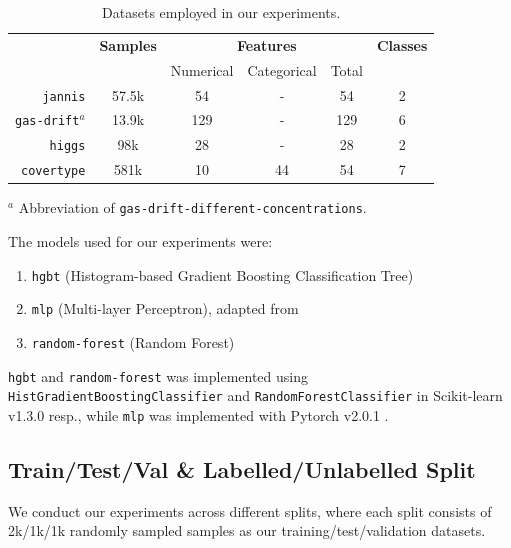 \documentclass{article}
\begin{document}
\begin{table}[htbp]
  \centering
  \caption{Datasets employed in our experiments.}
  \label{tab:datasets}
  \begin{tabular}{rccccc}
    \toprule
    & \textbf{Samples} & \multicolumn{3}{c}{\textbf{Features}} & \textbf{Classes} \\
    \cmidrule(lr){3-5}
    & & Numerical & Categorical & Total \\
    \midrule
    \small\texttt{jannis} \cite{grinsztajn2022why} & 57.5k & 54 & - & 54 & 2 \\
    \small\texttt{gas-drift}$^a$ \cite{grinsztajn2022why,shwartz-ziv2021tabular}
    & 13.9k & 129 & - & 129 & 6 \\
    \small\texttt{higgs} \cite{grinsztajn2022why,shwartz-ziv2021tabular}
    & 98k & 28 & - & 28 & 2 \\
    \small\texttt{covertype} \cite{shwartz-ziv2021tabular}
    & 581k & 10 & 44 & 54 & 7 \\
    \bottomrule
  \end{tabular}

  \footnotesize{
    $^a$ Abbreviation of \texttt{gas-drift-different-concentrations}.
  }
\end{table}

The models used for our experiments were: \begin{enumerate}
  \item \texttt{hgbt} (Histogram-based Gradient Boosting Classification Tree)
  \item \texttt{mlp} (Multi-layer Perceptron), adapted from
  \cite{gorishniy2021revisiting}
  \item \texttt{random-forest} (Random Forest)
\end{enumerate}
\texttt{hgbt} and \texttt{random-forest} was implemented using
\texttt{HistGradientBoostingClassifier} and \texttt{RandomForestClassifier} in
Scikit-learn v1.3.0 \cite{pedregosa2011scikitlearn} resp., while \texttt{mlp} was
implemented with Pytorch v2.0.1 \cite{paszke2019pytorch}.

\subsection{Train/Test/Val \& Labelled/Unlabelled Split}

We conduct our experiments across different splits, where each split consists of
2k/1k/1k randomly sampled samples as our training/test/validation datasets.
\end{document}
